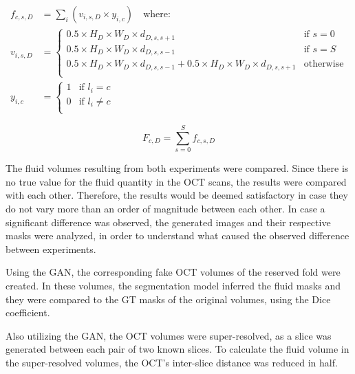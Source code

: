 \begin{equation}
	\begin{aligned}
		f_{c,s,D} &= \sum_{i} \left( v_{i,s,D} \times y_{i,c} \right) \quad \text{where: }\\
		v_{i,s,D} &=
		\begin{cases}
			0.5 \times H_{D} \times W_{D} \times d_{D,s,s+1} & \text{if $s=0$}\\
			0.5 \times H_{D} \times W_{D} \times d_{D,s,s-1} & \text{if $s=S$}\\
			0.5 \times H_{D} \times W_{D} \times d_{D,s,s-1} + 0.5 \times H_{D} \times W_{D} \times d_{D,s,s+1} & 
			\text{otherwise}\\
		\end{cases}\\
		y_{i,c} &=
		\begin{cases}
			1 &\text{if } l_{i} = c\\
			0 &\text{if } l_{i} \neq c\\
		\end{cases} 
		\label{eq:FluidEstimationSlice}
	\end{aligned}
\end{equation}

\begin{equation}
	F_{c,D} = \sum_{s=0}^{S} f_{c,s,D}
	\label{eq:FluidEstimationVolume}
\end{equation}

The fluid volumes resulting from both experiments were compared. Since there is no true value for the fluid quantity in the OCT scans, the results were compared with each other. Therefore, the results would be deemed satisfactory in case they do not vary more than an order of magnitude between each other. In case a significant difference was observed, the generated images and their respective masks were analyzed, in order to understand what caused the observed difference between experiments. 
\par
Using the GAN, the corresponding fake OCT volumes of the reserved fold were created. In these volumes, the segmentation model inferred the fluid masks and they were compared to the GT masks of the original volumes, using the Dice coefficient. 
\par
Also utilizing the GAN, the OCT volumes were super-resolved, as a slice was generated between each pair of two known slices. To calculate the fluid volume in the super-resolved volumes, the OCT's inter-slice distance was reduced in half.